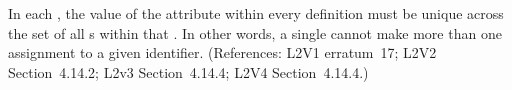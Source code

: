 In each \Event, the value of the  attribute
within every \EventAssignment definition must be unique across the set of
all \EventAssignment{}s within that \Event.  In other words, a
single \Event cannot make more than one assignment to a given
identifier.  (References: L2V1 erratum~17; L2V2 Section~4.14.2;
L2v3 Section~4.14.4; L2V4 Section~4.14.4.)

